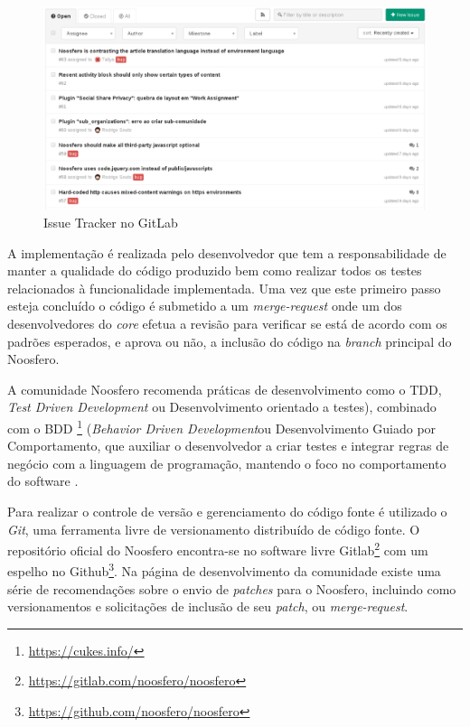 \begin{figure}[h]
    \centering
    \includegraphics[keepaspectratio=true,scale=0.4]
      {figuras/issueTrackerGitLab.eps}
    \caption{Issue Tracker no GitLab}
    \label{issue-tracker}
\end{figure}

A implementação é realizada pelo desenvolvedor que tem a responsabilidade de manter a qualidade do código produzido bem como realizar todos os testes relacionados à funcionalidade implementada. Uma vez que este primeiro passo esteja concluído o código é submetido a um \textit{merge-request} onde um dos desenvolvedores do \textit{core} efetua a revisão para verificar se está de acordo com os padrões esperados, e aprova ou não, a inclusão do código na \textit{branch} principal do Noosfero.

A comunidade Noosfero recomenda práticas de desenvolvimento como o TDD, \textit{Test Driven Development} ou Desenvolvimento orientado a testes), combinado com o BDD \footnote{\url{https://cukes.info/}} (\textit{Behavior Driven Development}ou Desenvolvimento Guiado por Comportamento, que auxiliar o desenvolvedor a criar testes e integrar regras de negócio com a linguagem de programação, mantendo o foco no comportamento do software \cite{north2006introducing}.

Para realizar o controle de versão e gerenciamento do código fonte é utilizado o \textit{Git}, uma ferramenta livre de versionamento distribuído de código fonte. O repositório oficial do Noosfero encontra-se no software livre Gitlab\footnote{\url{https://gitlab.com/noosfero/noosfero}} com um espelho no Github\footnote{\url{https://github.com/noosfero/noosfero}}. Na página de desenvolvimento da comunidade existe uma série de recomendações sobre o envio de \textit{patches} para o Noosfero, incluindo como versionamentos e solicitações de inclusão de seu \textit{patch}, ou \textit{merge-request}.

